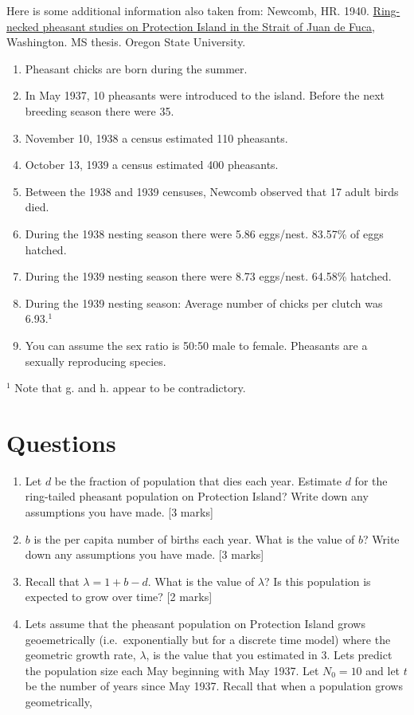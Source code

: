 \documentclass[]{book}
\providecommand{\tightlist}{%
  \setlength{\itemsep}{0pt}\setlength{\parskip}{0pt}}
\begin{document}
Here is some additional information also taken from: Newcomb, HR. 1940.
\href{https://ir.library.oregonstate.edu/concern/graduate_thesis_or_dissertations/js956j801?locale=en}{Ring-necked
pheasant studies on Protection Island in the Strait of Juan de Fuca},
Washington. MS thesis. Oregon State University.

\begin{enumerate}
\def\labelenumi{\alph{enumi}.}
\tightlist
\item
  Pheasant chicks are born during the summer.
\item
  In May 1937, 10 pheasants were introduced to the island. Before the
  next breeding season there were 35.
\item
  November 10, 1938 a census estimated 110 pheasants.
\item
  October 13, 1939 a census estimated 400 pheasants.
\item
  Between the 1938 and 1939 censuses, Newcomb observed that 17 adult
  birds died.
\item
  During the 1938 nesting season there were 5.86 eggs/nest. 83.57\% of
  eggs hatched.
\item
  During the 1939 nesting season there were 8.73 eggs/nest. 64.58\%
  hatched.
\item
  During the 1939 nesting season: Average number of chicks per clutch
  was 6.93.\(^1\)
\item
  You can assume the sex ratio is 50:50 male to female. Pheasants are a
  sexually reproducing species.
\end{enumerate}

\(^1\) Note that g. and h. appear to be contradictory.

\section{Questions}\label{questions-5}

\begin{enumerate}
\def\labelenumi{\arabic{enumi}.}
\item
  Let \(d\) be the fraction of population that dies each year. Estimate
  \(d\) for the ring-tailed pheasant population on Protection Island?
  Write down any assumptions you have made. {[}3 marks{]}
\item
  \(b\) is the per capita number of births each year. What is the value
  of \(b\)? Write down any assumptions you have made. {[}3 marks{]}
\item
  Recall that \(\lambda = 1 + b-d\). What is the value of \(\lambda\)?
  Is this population is expected to grow over time? {[}2 marks{]}
\item
  Lets assume that the pheasant population on Protection Island grows
  geoemetrically (i.e.~exponentially but for a discrete time model)
  where the geometric growth rate, \(\lambda\), is the value that you
  estimated in 3. Lets predict the population size each May beginning
  with May 1937. Let \(N_0 = 10\) and let \(t\) be the number of years
  since May 1937. Recall that when a population grows geometrically,
\end{enumerate}
\end{document}

